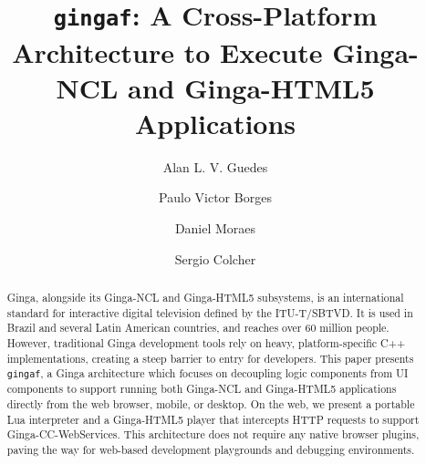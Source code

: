 \documentclass[sigconf,authorversion,review,authordraft]{webmedia}
\newcommand{\projectname}{\texttt{gingaf}}
\begin{document}
\title{\projectname{}: A Cross-Platform Architecture to Execute Ginga-NCL and Ginga-HTML5 Applications}

\author{Alan L. V. Guedes}

\author{Paulo Victor Borges}

\author{Daniel Moraes}

\author{Sergio Colcher}

\renewcommand{\shortauthors}{Guedes et al.}

\begin{abstract}
  Ginga, alongside its Ginga-NCL and Ginga-HTML5 subsystems, is an international standard for interactive digital television defined by the ITU-T/SBTVD. It is used in Brazil and several Latin American countries, and reaches over 60 million people. However, traditional Ginga development tools rely on heavy, platform-specific C++ implementations, creating a steep barrier to entry for developers. This paper presents \projectname{}, a Ginga architecture which focuses on decoupling  logic components from UI components to support running both Ginga-NCL and Ginga-HTML5 applications directly from the web browser, mobile, or desktop. On the web, we present a portable Lua interpreter and a Ginga-HTML5 player that intercepts HTTP requests to support Ginga-CC-WebServices. This architecture does not require any native browser plugins, paving the way for web-based development playgrounds and debugging environments.
\end{abstract}

\end{document}
